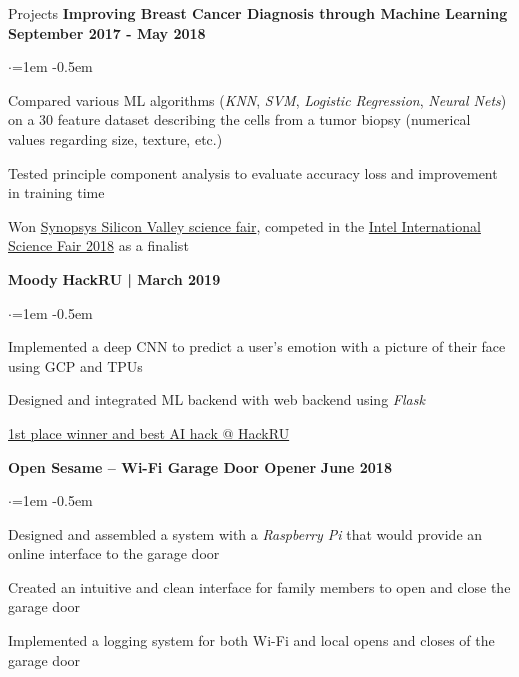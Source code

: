 \documentclass{resume} %
\begin{document}
\begin{rSection}{Projects}
{\bf Improving Breast Cancer Diagnosis through Machine Learning} \hfill {\bf September 2017 - May 2018}
 \begin{list}{$\cdot$}{\leftmargin=1em} %
   \itemsep -0.5em \vspace{-0.5em} %
	\item 
		Compared various ML algorithms (\textit{KNN}, \textit{SVM}, \textit{Logistic Regression}, \textit{Neural Nets}) on a 30 feature dataset describing the cells from a tumor biopsy (numerical values regarding size, texture, etc.)
	\item
		Tested principle component analysis to evaluate accuracy loss and improvement in training time
	\item
		Won \underline{Synopsys Silicon Valley science fair}, competed in the \underline{Intel International Science Fair 2018} as a finalist
  \end{list}

{\bf Moody}  \hfill {\bf HackRU | March 2019}
 \begin{list}{$\cdot$}{\leftmargin=1em} %
   \itemsep -0.5em \vspace{-0.5em} %
	\item 
		Implemented a deep CNN to predict a user’s emotion with a picture of their face using GCP and TPUs
	\item
		Designed and integrated ML backend with web backend using \textit{Flask}
	\item
		\underline{1st place winner and best AI hack @ HackRU}
  \end{list}

{\bf Open Sesame – Wi-Fi Garage Door Opener}  \hfill {\bf June 2018}
 \begin{list}{$\cdot$}{\leftmargin=1em} %
   \itemsep -0.5em \vspace{-0.5em} %
	\item 
		Designed and assembled a system with a \textit{Raspberry Pi} that would provide an online interface to the garage door
	\item
		Created an intuitive and clean interface for family members to open and close the garage door
	\item
		Implemented a logging system for both Wi-Fi and local opens and closes of the garage door
  \end{list}


\end{rSection}
\end{document}
